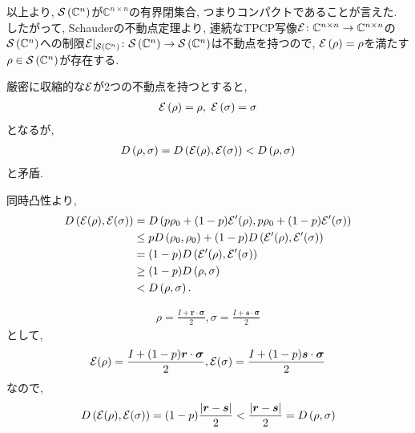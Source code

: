 \begin{ex}
    以上より, $\mathcal{S}\left({\mathbb{C}^{n}}\right)$が$\mathbb{C}^{n \times n}$の有界閉集合, つまりコンパクトであることが言えた. したがって, Schauderの不動点定理より, 連続なTPCP写像$\mathcal{E} \colon \mathbb{C}^{n \times n} \to \mathbb{C}^{n \times n}$の$\mathcal{S}\left({\mathbb{C}^n}\right)$への制限$\mathcal{E}|_{\mathcal{S}\left({\mathbb{C}^n}\right)} \colon \mathcal{S}\left({\mathbb{C}^n}\right) \to \mathcal{S}\left({\mathbb{C}^n}\right)$は不動点を持つので, $\mathcal{E} \left(\rho\right) = \rho$を満たす$\rho \in \mathcal{S}\left({\mathbb{C}^n}\right)$が存在する.
\end{ex}

\begin{ex}
    \label{ex9.10}
    厳密に収縮的な$\mathcal{E}$が2つの不動点を持つとすると,
    \begin{align*}
        \mathcal{E} \left( \rho\right) = \rho, \ \mathcal{E} \left( \sigma\right) = \sigma
    \end{align*}
    となるが,
    \begin{align*}
        D \left( \rho , \sigma\right)
        =
        D \left( \mathcal{E}(\rho) , \mathcal{E}(\sigma)\right)
        <
        D \left( \rho , \sigma\right)
    \end{align*}
    と矛盾.
\end{ex}

\begin{ex}
    \label{ex9.11}
    同時凸性より,
    \begin{align*}
        D \left( \mathcal{E}(\rho), \mathcal{E}(\sigma)\right)
         & =
        D\left( p \rho_0 + (1-p)\mathcal{E}'(\rho), p \rho_0 + (1-p)\mathcal{E}'(\sigma) \right)
        \\
         & \leq
        p D \left( \rho_0, \rho_0\right)
        +
        (1-p) D \left( \mathcal{E}'(\rho), \mathcal{E}'(\sigma)\right)
        \\
         & =
        (1-p) D \left( \mathcal{E}'(\rho), \mathcal{E}'(\sigma)\right)
        \\
         & \geq(1-p)D\left( \rho, \sigma\right)
        \\
         & < D \left( \rho, \sigma\right).
    \end{align*}
\end{ex}

\begin{ex}
    \label{ex9.12}
    \begin{align*}
        \rho = \frac{I + \bm{r} \cdot \bm{\sigma}}{2},
        \sigma = \frac{I + \bm{s} \cdot \bm{\sigma}}{2}
    \end{align*}
    として,
    \begin{align*}
        \mathcal{E}(\rho)
        =
        \frac{I + (1-p)\bm{r}\cdot\bm{\sigma}}{2},
        \mathcal{E}(\sigma)
        =
        \frac{I + (1-p)\bm{s}\cdot\bm{\sigma}}{2}
    \end{align*}
    なので,
    \begin{align*}
        D \left( \mathcal{E}(\rho), \mathcal{E}(\sigma)\right)
        = (1-p)\frac{\left| \bm{r}- \bm{s} \right|}{2}
        <\frac{\left| \bm{r}- \bm{s} \right|}{2}
        = D \left( \rho, \sigma\right)
    \end{align*}
\end{ex}

